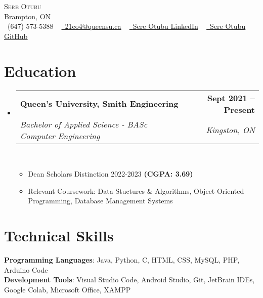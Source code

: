 \documentclass[letterpaper,11pt]{article}
\makeatletter
\newcommand{\resumeItem}[1]{
  \item\small{
    {#1 \vspace{-2pt}}
  }
}
\newcommand{\resumeSubheading}[4]{
  \vspace{-2pt}\item
    \begin{tabular*}{1.0\textwidth}[t]{l@{\extracolsep{\fill}}r}
      \textbf{#1} & \textbf{\small #2} \\
      \textit{\small#3} & \textit{\small #4} \\
    \end{tabular*}\vspace{-7pt}
}
\newcommand{\resumeSubHeadingListStart}{\begin{itemize}[leftmargin=0.0in, label={}]}
\newcommand{\resumeSubHeadingListEnd}{\end{itemize}}
\newcommand{\resumeItemListStart}{\begin{itemize}}
\newcommand{\resumeItemListEnd}{\end{itemize}\vspace{-5pt}}
\makeatother
\begin{document}

\begin{center}
    {\Huge \scshape Sere Otubu} \\ \vspace{1pt}
    Brampton, ON \\ \vspace{1pt}
    \small \raisebox{-0.1\height}\faPhone\ (647) 573-5388 ~ \href{mailto:youremail@email.com}{\raisebox{-0.2\height}\faEnvelope\  \underline{21eo4@queensu.ca}} ~ 
    \href{https://www.linkedin.com/in/sere-otubu-9782b1251/}{\raisebox{-0.2\height}\faLinkedin\ \underline{Sere Otubu LinkedIn}}  ~
    \href{https://github.com/IceBergSlim111}{\raisebox{-0.2\height}\faGithub\ \underline{Sere Otubu GitHub}}
    \vspace{-8pt}
\end{center}

\section{Education}
  \resumeSubHeadingListStart
    \resumeSubheading
      {Queen's University, Smith Engineering}{Sept 2021 -- Present}
      {Bachelor of Applied Science - BASc Computer Engineering}{Kingston, ON}\
      \resumeItemListStart
      \resumeItem{Dean Scholars Distinction 2022-2023 \textbf{(CGPA: 3.69)}}
      \resumeItem{Relevant Coursework: Data Stuctures \& Algorithms, Object-Oriented Programming, Database Management Systems}
      \resumeItemListEnd
  \resumeSubHeadingListEnd

\section{Technical Skills}
 \begin{itemize}[leftmargin=0.15in, label={}]
    \small{\item{
     \textbf{Programming Languages}{: Java, Python, C, HTML, CSS, MySQL, PHP, Arduino Code} \\
    \textbf{Development Tools}{: Visual Studio Code, Android Studio, Git, JetBrain IDEs, Google Colab, Microsoft Office, XAMPP} \\
    }}
 \end{itemize}
 \vspace{-16pt}
\end{document}
